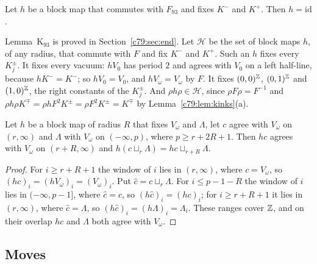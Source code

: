 \begin{lemma}[Lemma K$_{93}$]\label{c79:lem:K}
Let $h$ be a block map that commutes with $F_{93}$ and fixes $K^-$ and $K^+$. Then $h=\mathrm{id}$.
\end{lemma}

Lemma~K$_{93}$ is proved in Section~\ref{c79:sec:end}. Let $\mathcal H$ be the set of block maps $h$, of any radius, that commute with $F$ and fix $K^-$ and $K^+$. Such an $h$ fixes every $K^\pm_j$. It fixes every vacuum: $hV_0$ has period $2$ and agrees with $V_0$ on a left half-line, because $hK^-=K^-$; so $hV_0=V_0$, and $hV_\omega=V_\omega$ by $F$. It fixes $(0,0)^{\mathbb{Z}}$, $(0,1)^{\mathbb{Z}}$ and $(1,0)^{\mathbb{Z}}$, the right constants of the $K^\pm_j$. And $\rho h\rho\in\mathcal H$, since $\rho F\rho=F^{-1}$ and $\rho h\rho K^\mp=\rho hF^2K^\pm=\rho F^2K^\pm=K^\mp$ by Lemma~\ref{c79:lem:kinks}(a).

\begin{lemma}\label{c79:lem:hglue}
Let $h$ be a block map of radius $R$ that fixes $V_\omega$ and $\Lambda$, let $c$ agree with $V_\omega$ on $(r,\infty)$ and $\Lambda$ with $V_\omega$ on $(-\infty,p)$, where $p\ge r+2R+1$. Then $hc$ agrees with $V_\omega$ on $(r+R,\infty)$ and $h(c\sqcup_r\Lambda)=hc\sqcup_{r+R}\Lambda$.
\end{lemma}

\begin{proof}
For $i\ge r+R+1$ the window of $i$ lies in $(r,\infty)$, where $c=V_\omega$, so $(hc)_i=(hV_\omega)_i=(V_\omega)_i$. Put $\hat c=c\sqcup_r\Lambda$. For $i\le p-1-R$ the window of $i$ lies in $(-\infty,p-1]$, where $\hat c=c$, so $(h\hat c)_i=(hc)_i$; for $i\ge r+R+1$ it lies in $(r,\infty)$, where $\hat c=\Lambda$, so $(h\hat c)_i=(h\Lambda)_i=\Lambda_i$. These ranges cover $\mathbb{Z}$, and on their overlap $hc$ and $\Lambda$ both agree with $V_\omega$.
\end{proof}

\subsection{Moves}\label{c79:sec:moves}


